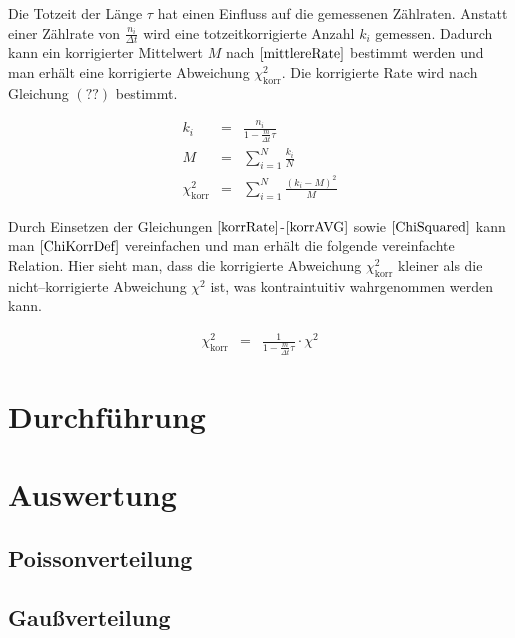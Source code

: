 \documentclass[12pt,a4paper]{scrartcl}
\numberwithin{equation}{section} %
\renewcommand{\[}{} %
\renewcommand{\]}{\noindent} %
\begin{document}
Die Totzeit der Länge \(\tau\) hat einen Einfluss auf die gemessenen
Zählraten. Anstatt einer Zählrate von \(\frac{n_i}{\Delta t}\) wird eine
totzeitkorrigierte Anzahl \(k_i\) gemessen. Dadurch kann ein
korrigierter Mittelwert \(M\) nach \(\eqref{mittlereRate}\) bestimmt
werden und man erhält eine korrigierte Abweichung
\(\chi^2_\mathrm{korr}\). Die korrigierte Rate wird nach Gleichung
\((??)\) bestimmt.

\[
\begin{eqnarray}
    k_i &=&
        \frac{
            n_i
        }{
            1 - \frac{m}{\Delta t}\tau
        } \label{korrRate} \\
    M &=& \sum_{i=1}^N \frac{k_i}{N} \label{korrAVG} \\
    \chi^2_\mathrm{korr} &=& \sum_{i=1}^N
        \frac{(k_i - M)^2}{M} \label{ChiKorrDef}
\end{eqnarray}
\]

Durch Einsetzen der Gleichungen \(\eqref{korrRate}\)-\(\eqref{korrAVG}\)
sowie \(\eqref{ChiSquared}\) kann man \(\eqref{ChiKorrDef}\)
vereinfachen und man erhält die folgende vereinfachte Relation. Hier
sieht man, dass die korrigierte Abweichung \(\chi^2_\mathrm{korr}\)
kleiner als die nicht--korrigierte Abweichung \(\chi^2\) ist, was
kontraintuitiv wahrgenommen werden kann.

\[
\begin{eqnarray}
    \chi^2_\mathrm{korr} &=&
        \frac{1}{1 - \frac{m}{\Delta t}\tau} \cdot \chi^2
\end{eqnarray}
\]

\clearpage
\hypertarget{durchfuxfchrung}{%
\section{Durchführung}\label{durchfuxfchrung}}

\clearpage
\hypertarget{auswertung}{%
\section{Auswertung}\label{auswertung}}

\hypertarget{poissonverteilung}{%
\subsection{Poissonverteilung}\label{poissonverteilung}}

\hypertarget{gauuxdfverteilung}{%
\subsection{Gaußverteilung}\label{gauuxdfverteilung}}
\end{document}
